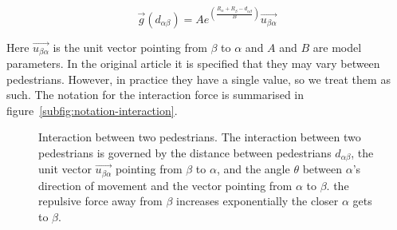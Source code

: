 \begin{equation}
    \overrightarrow{g}
    \left(
        d_{\alpha \beta}
    \right)
    =
    A e^{ \left(
        \frac{ R_\alpha + R_\beta - d_{\alpha \beta}}
             {B}
    \right)}
    \overrightarrow{u_{\beta \alpha}}
    \label{re}	
\end{equation}

Here $\overrightarrow{u_{\beta \alpha}}$ is the unit vector pointing from
$\beta$ to $\alpha$ and $A$ and $B$ are model parameters. In the original
article it is specified that they may vary between pedestrians. However, in
practice they have a single value, so we treat them as such. The notation for
the interaction force is summarised in
figure~\ref{subfig:notation-interaction}.

\begin{figure}[h]
    \centering
    \caption[Interaction between two
    pedestrians.]{Interaction between two pedestrians.  
     The interaction between two  
    pedestrians is governed by the distance between pedestrians $d_{\alpha 
    \beta}$, the unit vector $\overrightarrow{u_{\beta \alpha}}$ pointing from 
    $\beta$ to $\alpha$, and the angle $\theta$ between $\alpha$'s direction 
    of movement and the vector pointing from $\alpha$ to $\beta$.  
     the repulsive force away from $\beta$ 
    increases exponentially the closer $\alpha$ gets to $\beta$.} 
    \label{fig:pedestrian-interaction}
\end{figure}

